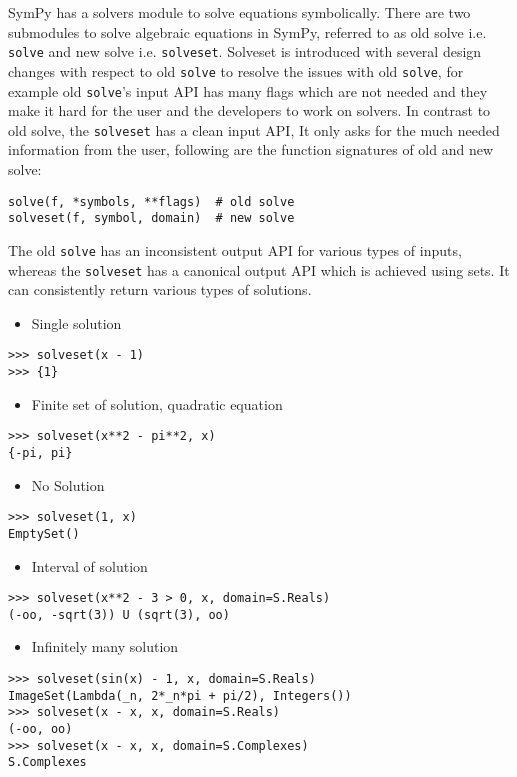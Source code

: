 

SymPy has a solvers module to solve equations symbolically. There are two
submodules to solve algebraic equations in SymPy, referred to as old solve
i.e. \texttt{solve} and new solve i.e. \texttt{solveset}. Solveset is
introduced with several design changes with respect to old \texttt{solve} to
resolve the issues with old \texttt{solve}, for example old \texttt{solve}'s
input API has many flags which are not needed and they make it hard for the
user and the developers to work on solvers. In contrast to old solve, the
\texttt{solveset} has a clean input API, It only asks for the much needed
information from the user, following are the function signatures of old and new
solve:

\begin{verbatim}
solve(f, *symbols, **flags)  # old solve
solveset(f, symbol, domain)  # new solve
\end{verbatim}

The old \texttt{solve} has an inconsistent output API for various types of
inputs, whereas the \texttt{solveset} has a canonical output API which is
achieved using sets. It can consistently return various types of solutions.

\begin{itemize}
\item Single solution
\end{itemize}
\begin{verbatim}
>>> solveset(x - 1)
>>> {1}
\end{verbatim}

\begin{itemize}
\item Finite set of solution, quadratic equation
\end{itemize}
\begin{verbatim}
>>> solveset(x**2 - pi**2, x)
{-pi, pi}
\end{verbatim}

\begin{itemize}
\item No Solution
\end{itemize}
\begin{verbatim}
>>> solveset(1, x)
EmptySet()
\end{verbatim}

\begin{itemize}
\item Interval of solution
\end{itemize}
\begin{verbatim}
>>> solveset(x**2 - 3 > 0, x, domain=S.Reals)
(-oo, -sqrt(3)) U (sqrt(3), oo)
\end{verbatim}

\begin{itemize}
\item Infinitely many solution
\end{itemize}
\begin{verbatim}
>>> solveset(sin(x) - 1, x, domain=S.Reals)
ImageSet(Lambda(_n, 2*_n*pi + pi/2), Integers())
>>> solveset(x - x, x, domain=S.Reals)
(-oo, oo)
>>> solveset(x - x, x, domain=S.Complexes)
S.Complexes
\end{verbatim}
